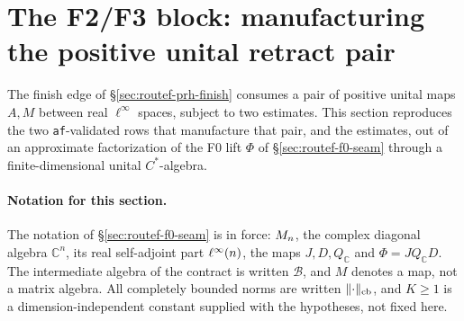 \section{The F2/F3 block: manufacturing the positive unital retract pair}\label{sec:routef-f2-f3}

The finish edge of \S\ref{sec:routef-prh-finish} consumes a pair of positive unital maps
$A,M$ between real $\ell^{\infty}$ spaces, subject to two estimates. This section
reproduces the two \texttt{af}-validated rows that manufacture that pair, and the estimates,
out of an approximate factorization of the F0 lift $\Phi$ of \S\ref{sec:routef-f0-seam}
through a finite-dimensional unital $C^{*}$-algebra.

\paragraph{Notation for this section.} The notation of \S\ref{sec:routef-f0-seam} is in
force: $M_{n}$, the complex diagonal algebra $\mathbb C^{n}$, its real self-adjoint part
$\ell^{\infty}(n)$, the maps $J,D,Q_{\mathbb C}$ and $\Phi=JQ_{\mathbb C}D$. The intermediate
algebra of the contract is written $\mathcal B$, and $M$ denotes a map, not a matrix
algebra. All completely bounded norms are written $\lVert \cdot\rVert_{\mathrm{cb}}$, and $K\ge1$
is a dimension-independent constant supplied with the hypotheses, not fixed here.


